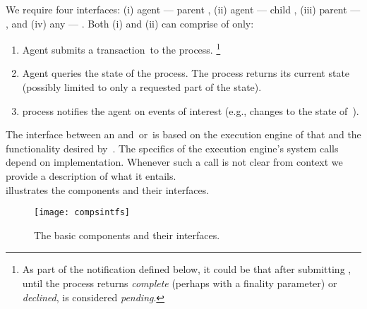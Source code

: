 We require four interfaces: (i) \ipc agent --- parent \smr, (ii) \ipc agent --- child \smr, (iii) parent \smr --- \sa, and (iv) any \smr --- \gw. Both (i) and (ii) can comprise of only:
\begin{enumerate}
    \item Agent submits a transaction~\tx to the \smr process.%
    \footnote{As part of the notification defined below, it could be that after submitting \tx, until the \smr process returns \textit{complete} (perhaps with a finality parameter) or \textit{declined}, \tx is considered \textit{pending}.}
    \item Agent queries the state of the \smr process. The \smr process returns its current state (possibly limited to only a requested part of the state).
    \item \smr process notifies the agent on events of interest (e.g., changes to the state of~\sa).
\end{enumerate}

The interface between an \smr and~\sa or~\gw is based on the execution engine of that \smr and the functionality desired by~\sa. The specifics of the execution engine's system calls depend on implementation. Whenever such a call is not clear from context we provide a description of what it entails. \\

 illustrates the components and their interfaces.\\

\begin{figure}[h]
     \centering
     \texttt{[image: compsintfs]}
     \caption{The basic components and their interfaces.}
     \label{fig:interfaces}
 \end{figure}

